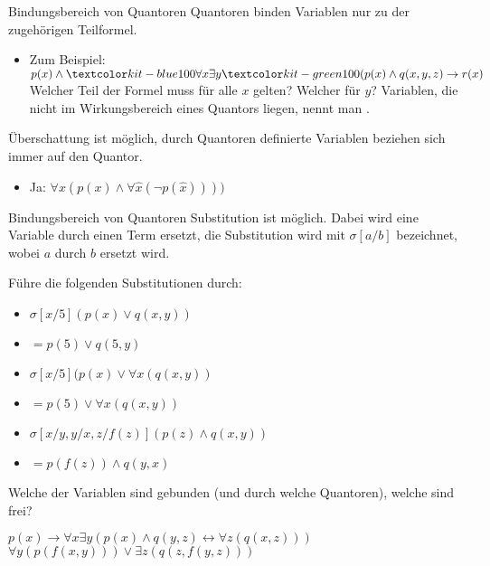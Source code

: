 \documentclass[handout]{beamer}
\begin{document}
\begin{frame}{Bindungsbereich von Quantoren}
	Quantoren binden Variablen nur zu der zugehörigen Teilformel.
	
	\bp
	
	\begin{itemize}
		\item Zum Beispiel: $p(x) \land \markBlue{\forall x \exists y} \markGreen{(p(x) \land q(x,y,z)} \rightarrow r(x) $
		\pitem Welcher Teil der Formel muss für alle $x$ gelten? Welcher für $y$?
		\pitem Variablen, die nicht im Wirkungsbereich eines Quantors liegen, nennt man .
	\end{itemize}

	\bp Überschattung ist möglich, durch Quantoren definierte Variablen beziehen sich immer auf den  Quantor.
	\begin{itemize}
		\pitem Ist $\forall x (p(x) \land \forall x (\lnot p(x))))$ erfüllbar?
		\pause\item Ja: $\forall x (p(x) \land \forall \hat{x} (\lnot p(\hat{x}))))$ 
	\end{itemize}
\end{frame}

\begin{frame}{Bindungsbereich von Quantoren}
	Substitution ist möglich. Dabei wird eine  Variable durch einen Term ersetzt, die Substitution wird mit $\sigma[a/b]$ bezeichnet, wobei $a$ durch $b$ ersetzt wird.
	
	\vertspace
	
	
	\bp
	
	Führe die folgenden Substitutionen durch:
	\begin{itemize}
		\item<1-> \(\sigma[x/5] (p(x) \lor q(x,y))\)
		\item<4-> \(= p(5) \lor q(5,y)\)
		\item<2-> \(\sigma[x/5] (p(x) \lor \forall x (q(x,y))\)
		\item<5-> \(= p(5) \lor \forall x (q(x,y))\)
		\item<3-> \(\sigma[x/y, y/x, z/f(z)] (p(z) \land q(x,y))\)
		\item<6-> \(= p(f(z)) \land q(y,x)\)
	\end{itemize}

	\vertspace
	
	\bp
	
	Welche der Variablen sind gebunden (und durch welche Quantoren), welche sind frei? 
	\begin{itemize}
		\pitem $p(x) \rightarrow \forall x \exists y (p(x) \land q(y,z) \leftrightarrow \forall z (q(x,z)))$
		\pitem $\forall y(p(f(x,y))) \lor \exists z(q(z,f(y,z)))$
	\end{itemize}
\end{frame}
\end{document}

